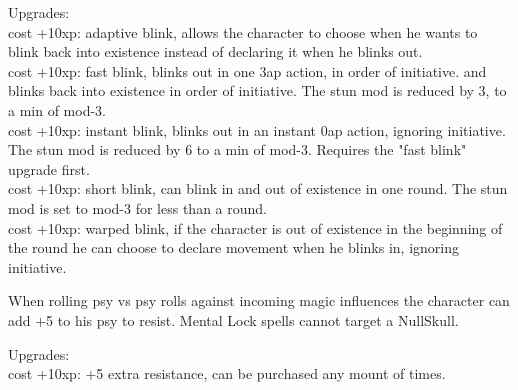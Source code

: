 Upgrades: \\
cost +10xp: adaptive blink, allows the character to choose when he wants to blink back into existence instead of declaring it when he blinks out. \\
cost +10xp: fast blink, blinks out in one 3ap action, in order of initiative.
and blinks back into existence in order of initiative. The stun mod is reduced by 3, to a min of mod-3. \\
cost +10xp: instant blink, blinks out in an instant 0ap action, ignoring initiative. The stun mod is reduced by 6 to a min of mod-3. Requires the "fast blink" upgrade first. \\
cost +10xp: short blink, can blink in and out of existence in one round. The stun mod is set to mod-3 for less than a round. \\
cost +10xp: warped blink, if the character is out of existence in the beginning of the round he can choose to declare movement when he blinks in, ignoring initiative.


 When rolling psy vs psy rolls against incoming magic influences the character can add +5 to his psy to resist. Mental Lock spells cannot target a NullSkull.

Upgrades:\\
cost +10xp: +5 extra resistance, can be purchased any mount of times.


%

